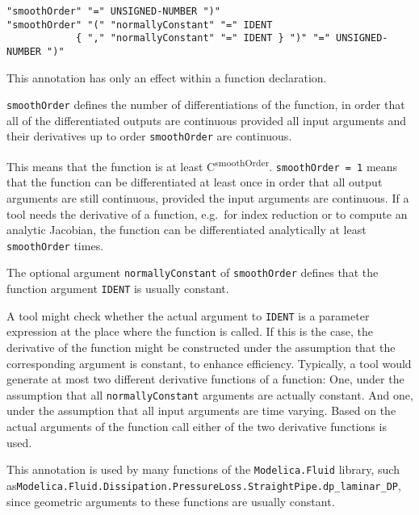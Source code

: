 \begin{annotationdefinition}[smoothOrder]
\begin{synopsis}[grammar]\begin{lstlisting}
"smoothOrder" "=" UNSIGNED-NUMBER ")"
"smoothOrder" "(" "normallyConstant" "=" IDENT
            { "," "normallyConstant" "=" IDENT } ")" "=" UNSIGNED-NUMBER ")"
\end{lstlisting}\end{synopsis}
\begin{semantics}
This annotation has only an effect within a function declaration.

\lstinline!smoothOrder! defines the number of differentiations of the function, in order that all of the differentiated outputs are continuous provided all input arguments and their derivatives up to order \lstinline!smoothOrder! are continuous.

\begin{nonnormative}
This means that the function is at least C\textsuperscript{smoothOrder}.  \lstinline!smoothOrder = 1! means that the function can be differentiated at least once in order that all output arguments are still continuous, provided the input arguments are continuous.  If a tool needs the derivative of a function, e.g.\ for index reduction or to compute an analytic Jacobian, the function can be differentiated analytically at least \lstinline!smoothOrder! times.
\end{nonnormative}

The optional argument \lstinline!normallyConstant! of \lstinline!smoothOrder! defines that the function argument \lstinline!IDENT! is usually constant.

\begin{nonnormative}
A tool might check whether the actual argument to \lstinline!IDENT! is a parameter expression at the place where the function is called.  If this is the case, the derivative of the function might be constructed under the assumption that the corresponding argument is constant, to enhance efficiency.  Typically, a tool would generate at most two different derivative functions of a function: One, under the assumption that all \lstinline!normallyConstant! arguments are actually constant.  And one, under the assumption that all input arguments are time varying.  Based on the actual arguments of the function call either of the two derivative functions is used.

This annotation is used by many functions of the \lstinline!Modelica.Fluid! library, such as\linebreak[4] \lstinline!Modelica.Fluid.Dissipation.PressureLoss.StraightPipe.dp_laminar_DP!, since geometric arguments to these functions are usually constant.
\end{nonnormative}
\end{semantics}
\end{annotationdefinition}

